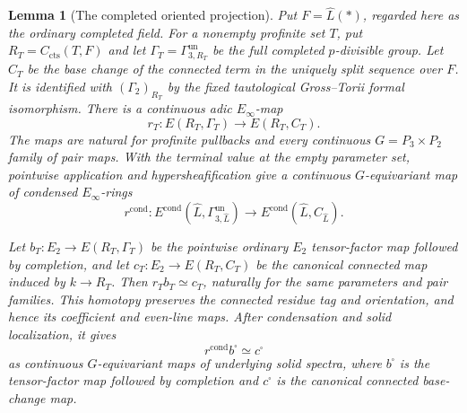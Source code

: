 \documentclass[11pt]{article}
\numberwithin{equation}{section}
\newtheorem{lemma}[theorem]{Lemma}
\theoremstyle{definition}
\theoremstyle{remark}
\newcommand{\cts}{\mathrm{cts}}
\begin{document}
\begin{lemma}[The completed oriented projection]
\label{lem:completed-oriented-map}
Put \(F=\widehat L(*)\), regarded here as the ordinary completed field.
For a nonempty profinite set \(T\), put \(R_T=C_{\cts}(T,F)\) and let
\(\Gamma_T=\Gamma^{\mathrm{un}}_{3,R_T}\) be the full completed
\(p\)-divisible group. Let \(C_T\) be the base change of the connected
term in the uniquely split sequence over \(F\). It is identified with
\((\Gamma_2)_{R_T}\) by the fixed tautological Gross--Torii formal
isomorphism. There is a continuous adic \(E_\infty\)-map
\[
 r_T:E(R_T,\Gamma_T)\longrightarrow E(R_T,C_T).
\]
The maps are natural for profinite pullbacks and every continuous
\(G=P_3\times P_2\) family of pair maps. With the terminal value at the
empty parameter set, pointwise application and hypersheafification give
a continuous \(G\)-equivariant map of condensed \(E_\infty\)-rings
\[
 r^{\mathrm{cond}}:
 E^{\mathrm{cond}}(\widehat L,\Gamma^{\mathrm{un}}_{3,\widehat L})
 \longrightarrow E^{\mathrm{cond}}(\widehat L,C_{\widehat L}).
\]

Let \(b_T:E_2\to E(R_T,\Gamma_T)\) be the pointwise ordinary
\(E_2\) tensor-factor map followed by completion, and let
\(c_T:E_2\to E(R_T,C_T)\) be the canonical connected map induced by
\(k\to R_T\). Then \(r_Tb_T\simeq c_T\), naturally for the same
parameters and pair families. This homotopy preserves the connected
residue tag and orientation, and hence its coefficient and even-line maps.
After condensation and solid localization, it gives
\[
 r^{\mathrm{cond}}b^\square\simeq c^\square
\]
as continuous \(G\)-equivariant maps of underlying solid spectra, where
\(b^\square\) is the tensor-factor map followed by completion and
\(c^\square\) is the canonical connected base-change map.
\end{lemma}
\end{document}
